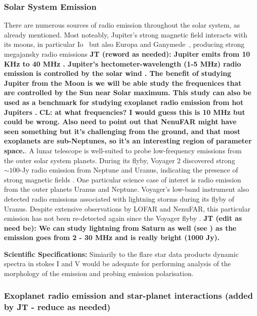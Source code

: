 \subsubsection{Solar System Emission} 
There are numerous sources of radio emission throughout the solar system, as already mentioned. Most noteably, Jupiter's strong magnetic field interacts with its moons, in particular Io~\citep{Io} but also Europa and Ganymede~\citep{Corentin}, producing strong megajansky radio emissions \textbf{JT (reword as needed): Jupiter emits from 10 KHz to 40 MHz \citep{zarka_auroral_1998}. Jupiter’s hectometer-wavelength (1-5 MHz) radio emission is controlled by the solar wind \citep{Desch1984}. The benefit of studying Jupiter from the Moon is we will be able study the frequenices that are controlled by the Sun near Solar maximum. This study can also be used as a benchmark for studying exoplanet radio emission from hot Jupiters \citep{Zarka2007,joe_nature_review}. } \textbf{CL: at what frequencies? I would guess this is 10 MHz but could be wrong. Also need to point out that NenuFAR might have seen something but it's challenging from the ground, and that most exoplanets are sub-Neptunes, so it's an interesting region of parameter space.}. A lunar telescope is well-suited to probe low-frequency emissions from the outer solar system planets. During its flyby, Voyager 2 discovered strong $\sim 100$-Jy radio emission from Neptune and Uranus, indicating the presence of strong magnetic fields \citep{zarka_auroral_1998, ZHANG199237}. One particular science case of interet is radio emission from the outer planets Uranus and Neptune. Voyager’s low-band instrument also detected radio emissions associated with lightning storms during its flyby of Uranus. Despite extensive observations by LOFAR and NenuFAR, this particular emission has not been re-detected again since the Voyager flyby \citep{1986Zarka_Emission}. \textbf{JT (edit as need be): We can study lightning from Saturn as well (see \citealt{Zarka2004}) as the emission goes from 2 - 30 MHz and is really bright (1000 Jy). }

\textbf{Scientific Specifications:} Simiarily to the flare star data products dynamic spectra in stokes I and V would be adequate for performing analysis of the morphology of the emission and probing emission polarisation. 

\subsubsection{Exoplanet radio emission and star-planet interactions (added by JT - reduce as needed)} 


